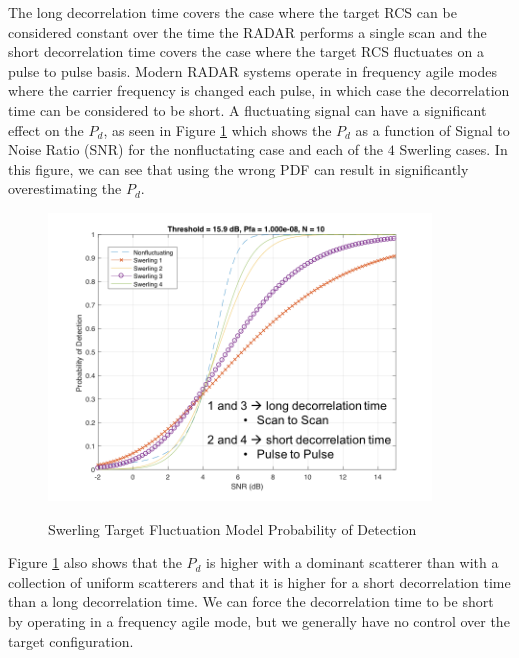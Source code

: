 The long decorrelation time covers the case where the target RCS can be considered constant over the time the RADAR performs a single scan and the short decorrelation time covers the case where the target RCS fluctuates on a pulse to pulse basis. Modern RADAR systems operate in frequency agile modes where the carrier frequency is changed each pulse, in which case the decorrelation time can be considered to be short. A fluctuating signal can have a significant effect on the $P_d$, as seen in Figure \ref{ms_fig:3} which shows the $P_d$ as a function of Signal to Noise Ratio (SNR) for the nonfluctating case and each of the $4$ Swerling cases. In this figure, we can see that using the wrong PDF can result in significantly overestimating the $P_d$.
\begin{figure}[H]
  \begin{center}
\includegraphics[width=4in]{../media/multistatic/swerling_pd.png}
  \end{center}
  \renewcommand{\baselinestretch}{1} \small\normalsize
  \begin{quote}
    \caption[Swerling Target Fluctuation Model Probability of Detection]{Swerling Target Fluctuation Model Probability of Detection\label{ms_fig:3}}
  \end{quote}
\end{figure}
\renewcommand{\baselinestretch}{2} \small\normalsize

Figure \ref{ms_fig:3} also shows that the $P_d$ is higher with a dominant scatterer than with a collection of uniform scatterers and that it is higher for a short decorrelation time than a long decorrelation time. We can force the decorrelation time to be short by operating in a frequency agile mode, but we generally have no control over the target configuration.